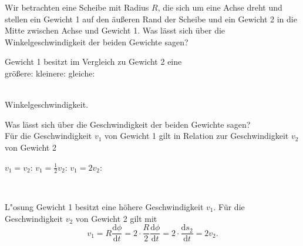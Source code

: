   \begin{MExercises}


\begin{MExercise}
Wir betrachten eine Scheibe mit Radius $R$, die sich um eine Achse dreht und stellen ein Gewicht 1 auf den \"au{\ss}eren Rand der Scheibe und ein Gewicht 2 in die Mitte zwischen Achse und Gewicht 1. Was l\"asst sich \"uber die Winkelgeschwindigkeit der beiden Gewichte sagen? \\

\begin{MQuestionGroup}
                  Gewicht 1 besitzt im Vergleich zu Gewicht 2 eine\\
                  gr\"o{\ss}ere:  
                  kleinere:  
                  gleiche:  
                  \end{MQuestionGroup}\\
                  Winkelgeschwindigkeit.
                  

\end{MExercise}

\begin{MExercise}
Was l\"asst sich \"uber die Geschwindigkeit der beiden Gewichte sagen?
\\

F\"ur die Geschwindigkeit $v_1$ von Gewicht 1 gilt in Relation zur Geschwindigkeit $v_2$ von Gewicht 2\\
\begin{MQuestionGroup}
                  $v_1=v_2$:  
                  $v_1=\frac{1}{2}v_2$:  
                  $v_1=2v_2$:  
                  \end{MQuestionGroup}\\
                  
                  
\begin{MHint}{L"osung}
Gewicht 1 besitzt eine h\"ohere Geschwindigkeit $v_1$. F\"ur die Geschwindigkeit $v_2$ von Gewicht 2 gilt mit 
$$
v_1=R\frac{\textrm{d}\phi}{\textrm{d}t}=2\cdot \frac{R}{2}\frac{\textrm{d}\phi}{\textrm{d}t}=2\cdot\frac{\textrm{d}s_2}{\textrm{d}t}=2v_2.
$$
\end{MHint}
\end{MExercise}

\end{MExercises}

